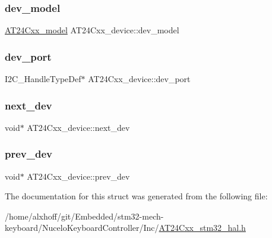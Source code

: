\subsubsection{\texorpdfstring{dev\+\_\+model}{dev\_model}}
{\footnotesize\ttfamily \hyperlink{AT24Cxx__stm32__hal_8h_acf0e41d1c3fd815f3aca979089e48ffa}{A\+T24\+Cxx\+\_\+model} A\+T24\+Cxx\+\_\+device\+::dev\+\_\+model}

\mbox{\label{structAT24Cxx__device_a8019b43b297b6e72d67d4290dd283239}} 
\subsubsection{\texorpdfstring{dev\+\_\+port}{dev\_port}}
{\footnotesize\ttfamily I2\+C\+\_\+\+Handle\+Type\+Def$\ast$ A\+T24\+Cxx\+\_\+device\+::dev\+\_\+port}

\mbox{\label{structAT24Cxx__device_ab0b5bedb44c25eed61b0b4c6b6dc4b68}} 
\subsubsection{\texorpdfstring{next\+\_\+dev}{next\_dev}}
{\footnotesize\ttfamily void$\ast$ A\+T24\+Cxx\+\_\+device\+::next\+\_\+dev}

\mbox{\label{structAT24Cxx__device_a9f98ca24de54367231ee76f91f1e377a}} 
\subsubsection{\texorpdfstring{prev\+\_\+dev}{prev\_dev}}
{\footnotesize\ttfamily void$\ast$ A\+T24\+Cxx\+\_\+device\+::prev\+\_\+dev}



The documentation for this struct was generated from the following file\+:\begin{DoxyCompactItemize}
\item 
/home/alxhoff/git/\+Embedded/stm32-\/mech-\/keyboard/\+Nucelo\+Keyboard\+Controller/\+Inc/\hyperlink{AT24Cxx__stm32__hal_8h}{A\+T24\+Cxx\+\_\+stm32\+\_\+hal.\+h}\end{DoxyCompactItemize}
